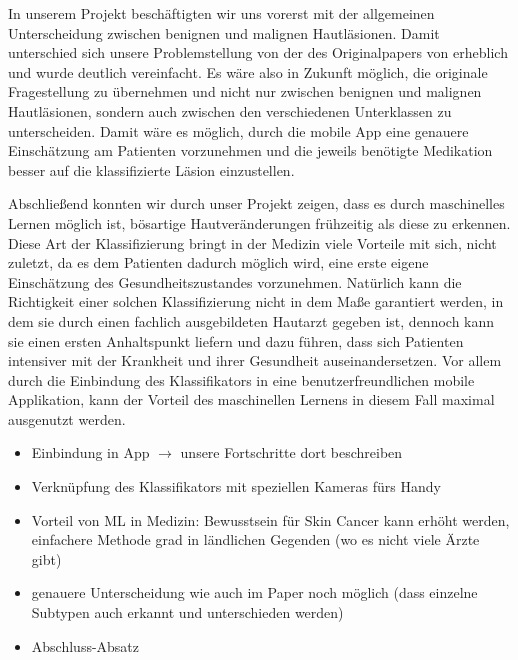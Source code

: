 In unserem Projekt beschäftigten wir uns vorerst mit der allgemeinen Unterscheidung zwischen benignen und malignen Hautläsionen. Damit unterschied sich unsere Problemstellung von der des Originalpapers von \citet{esteva2017dermatologist} erheblich und wurde deutlich vereinfacht. Es wäre also in Zukunft möglich, die originale Fragestellung zu übernehmen und nicht nur zwischen benignen und malignen Hautläsionen, sondern auch zwischen den verschiedenen Unterklassen zu unterscheiden. Damit wäre es möglich, durch die mobile App eine genauere Einschätzung am Patienten vorzunehmen und die jeweils benötigte Medikation besser auf die klassifizierte Läsion einzustellen.

Abschließend konnten wir durch unser Projekt zeigen, dass es durch maschinelles Lernen möglich ist, bösartige Hautveränderungen frühzeitig als diese zu erkennen. Diese Art der Klassifizierung bringt in der Medizin viele Vorteile mit sich, nicht zuletzt, da es dem Patienten dadurch möglich wird, eine erste eigene Einschätzung des Gesundheitszustandes vorzunehmen. Natürlich kann die Richtigkeit einer solchen Klassifizierung nicht in dem Maße garantiert werden, in dem sie durch einen fachlich ausgebildeten Hautarzt gegeben ist, dennoch kann sie einen ersten Anhaltspunkt liefern und dazu führen, dass sich Patienten intensiver mit der Krankheit und ihrer Gesundheit auseinandersetzen. Vor allem durch die Einbindung des Klassifikators in eine benutzerfreundlichen mobile Applikation, kann der Vorteil des maschinellen Lernens in diesem Fall maximal ausgenutzt werden.  
 
\color{red}

\begin{itemize}
	\item[\checkmark] Einbindung in App $\rightarrow$ unsere Fortschritte dort beschreiben
	\item[\checkmark] Verknüpfung des Klassifikators mit speziellen Kameras fürs Handy
	\item[\checkmark] Vorteil von ML in Medizin: Bewusstsein für Skin Cancer kann erhöht werden, einfachere Methode grad in ländlichen Gegenden (wo es nicht viele Ärzte gibt)
	\item[\checkmark] genauere Unterscheidung wie auch im Paper noch möglich (dass einzelne Subtypen auch erkannt und unterschieden werden)
	\item[\checkmark] Abschluss-Absatz

\end{itemize}
\color{black}